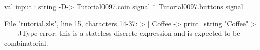 \runverbatimfalse
{}
\begin{RunVerbatimMsg}
val input :
  string -D-> Tutorial0097.coin signal * Tutorial0097.buttons signal
\end{RunVerbatimMsg}
\begin{RunVerbatimErr}
File "tutorial.zls", line 15, characters 14-37:
>  | Coffee -> print_string "Coffee\n"
>              ^^^^^^^^^^^^^^^^^^^^^^^
Type error: this is a stateless discrete expression and is expected to be combinatorial.
\end{RunVerbatimErr}
